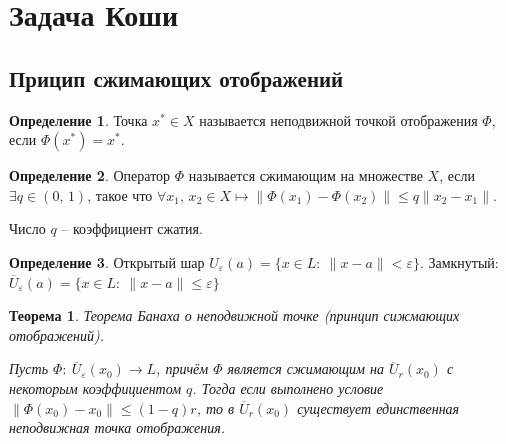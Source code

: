 \documentclass[a4paper,12pt]{article}
\renewcommand{\leq}{\ensuremath{\leqslant}}
\theoremstyle{plain}
\newtheorem{theorem}{Теорема}[section]
\theoremstyle{definition}
\newtheorem{definition}{Определение}[section]
\theoremstyle{remark}
\begin{document}
\section{Задача Коши}
\subsection{Прицип сжимающих отображений}
\begin{definition}
	Точка $x^* \in X$ называется неподвижной точкой отображения $\Phi$, если $\Phi(x^*) = x^*$.
\end{definition}

\begin{definition}
	Оператор $\Phi$ называется сжимающим на множестве $X$, если $\exists q \in (0,\,1)$, такое что $\forall x_1,\,x_2 \in X \mapsto \|\Phi(x_1) - \Phi(x_2)\| \leq q \|x_2 - x_1\|$.

	Число $q$ -- коэффициент сжатия.
\end{definition}

\begin{definition}
	Открытый шар $U_\varepsilon(a) = \{x \in L :\: \|x - a\| < \varepsilon\}$. Замкнутый: $\overline{U}_\varepsilon(a) = \{x \in L:\: \|x-a\|\leq\varepsilon\}$
\end{definition}

\begin{theorem}
	Теорема Банаха о неподвижной точке (принцип сижмающих отображений).

	Пусть $\Phi:\: \overline{U}_\varepsilon(x_0) \to L$, причём $\Phi$ является сжимающим на $\overline{U}_r(x_0)$ с некоторым коэффициентом $q$. Тогда если выполнено условие $\|\Phi(x_0) - x_0\| \leq (1 - q)r$, то в $\overline{U}_r(x_0)$ существует единственная неподвижная точка отображения.
\end{theorem}
\end{document}
